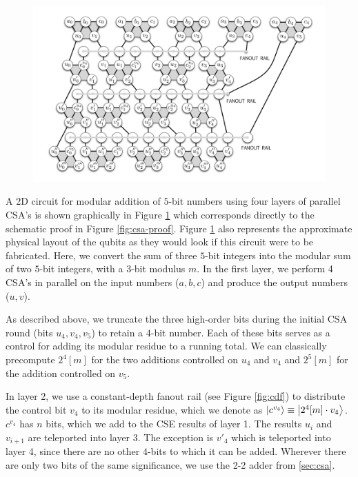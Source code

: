 \documentclass[twoside]{article}
\begin{document}
\begin{center}
\begin{figure}[h!bt]
\centerline{
\includegraphics[width=6.5in]{./mod-add-fixed.pdf}
}
\label{fig:csa-add-4}
\end{figure}
\end{center}

A 2D circuit for modular addition of $5$-bit numbers using
four layers of parallel CSA's is shown graphically in Figure \ref{fig:csa-add-4}
which corresponds directly to the schematic proof in Figure \ref{fig:csa-proof}.
Figure \ref{fig:csa-add-4} also represents the approximate
physical layout of the qubits as they would look if this
circuit were to be fabricated.
Here, we convert the sum of three
$5$-bit integers into the modular sum of two $5$-bit integers, with a
$3$-bit modulus $m$.
In the first layer,
we perform 4 CSA's in parallel on the input numbers ($a,b,c$) and produce the
output numbers ($u, v$).

As described above, we truncate
the three high-order bits during the initial CSA round
(bits $u_4, v_4, v_5$) to retain a $4$-bit number.
Each of these bits serves as a control for adding its modular residue to
a running total. We can classically precompute $2^4[m]$ for the two
additions controlled on $u_4$ and $v_4$ and
$2^5[m]$ for the addition controlled on $v_5$.

In layer 2,
we use a constant-depth fanout rail (see Figure \ref{fig:cdf}) to
distribute the control bit $v_4$ to its modular residue, which we denote as
$\left\vert{c^{v_4}}\right\rangle \equiv \left\vert{2^4[m]\cdot v_4}\right\rangle$.
$c^{v_4}$ has $n$ bits, which we add to the CSE results of layer 1.
The results $u_i$ and $v_{i+1}$ are teleported into layer 3. The exception is
$v'_4$ which is teleported into layer 4, since there are no other $4$-bits
to which it can be added. Wherever there are only
two bits of the same significance, we use the 2-2 adder from \ref{sec:csa}.
\end{document}
